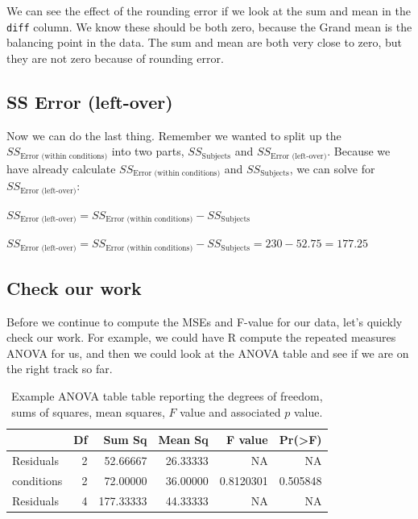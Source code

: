 \documentclass[
  letterpaper,
  DIV=11,
  numbers=noendperiod]{scrreprt}
\begin{document}
We can see the effect of the rounding error if we look at the sum and
mean in the \texttt{diff} column. We know these should be both zero,
because the Grand mean is the balancing point in the data. The sum and
mean are both very close to zero, but they are not zero because of
rounding error.

\subsection{SS Error (left-over)}\label{ss-error-left-over}

Now we can do the last thing. Remember we wanted to split up the
\(SS_\text{Error (within conditions)}\) into two parts,
\(SS_\text{Subjects}\) and \(SS_\text{Error (left-over)}\). Because we
have already calculate \(SS_\text{Error (within conditions)}\) and
\(SS_\text{Subjects}\), we can solve for
\(SS_\text{Error (left-over)}\):

\(SS_\text{Error (left-over)} = SS_\text{Error (within conditions)} - SS_\text{Subjects}\)

\(SS_\text{Error (left-over)} = SS_\text{Error (within conditions)} - SS_\text{Subjects} = 230 - 52.75 = 177.25\)

\subsection{Check our work}\label{check-our-work}

Before we continue to compute the MSEs and F-value for our data, let's
quickly check our work. For example, we could have R compute the
repeated measures ANOVA for us, and then we could look at the ANOVA
table and see if we are on the right track so far.

\begin{longtable}[]{@{}lrrrrr@{}}

\caption{\label{tbl-8rmANOVA1}Example ANOVA table table reporting the
degrees of freedom, sums of squares, mean squares, \(F\) value and
associated \(p\) value.}

\tabularnewline

\toprule\noalign{}
& Df & Sum Sq & Mean Sq & F value & Pr(\textgreater F) \\
\midrule\noalign{}
\endhead
\bottomrule\noalign{}
\endlastfoot
Residuals & 2 & 52.66667 & 26.33333 & NA & NA \\
conditions & 2 & 72.00000 & 36.00000 & 0.8120301 & 0.505848 \\
Residuals & 4 & 177.33333 & 44.33333 & NA & NA \\

\end{longtable}
\end{document}

